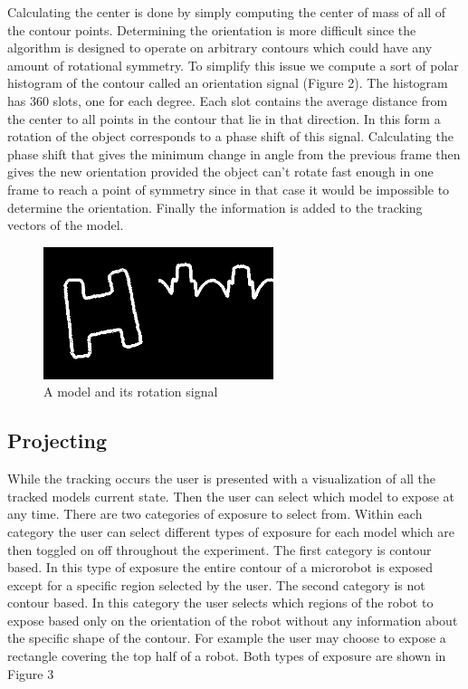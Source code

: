 \documentclass[11pt]{article}
\begin{document}
Calculating the center is done by simply computing the center of
mass of all of the contour points. Determining the orientation is
more difficult since the algorithm is designed to operate on
arbitrary contours which could have any amount of rotational
symmetry. To simplify this issue we compute a sort of polar
histogram of the contour called an orientation signal (Figure 2). The
histogram has 360 slots, one for each degree. Each slot contains
the average distance from the center to all points in the contour
that lie in that direction. In this form a rotation of the object
corresponds to a phase shift of this signal. Calculating the
phase shift that gives the minimum change in angle from the
previous frame then gives the new orientation provided the object
can't rotate fast enough in one frame to reach a point of symmetry
since in that case it would be impossible to determine the
orientation. Finally the information is added to the tracking
vectors of the model.

\begin{figure}[h!]
  \begin{center}
    \includegraphics[width=0.6\textwidth]{rotation_signal-0000}    
  \end{center}

  \caption{A model and its rotation signal}
  \label{fig:rotation_signal}
\end{figure}
\subsection{Projecting}
\label{sec-1-5}

While the tracking occurs the user is presented with a visualization
of all the tracked models current state. Then the user can select
which model to expose at any time. There are two categories of
exposure to select from. Within each category the user can select
different types of exposure for each model which are then toggled on
off throughout the experiment. The first category is contour based. In
this type of exposure the entire contour of a microrobot is exposed
except for a specific region selected by the user. The second category
is not contour based. In this category the user selects which regions
of the robot to expose based only on the orientation of the robot
without any information about the specific shape of the contour. For
example the user may choose to expose a rectangle covering the top
half of a robot. Both types of exposure are shown in Figure 3
\end{document}
